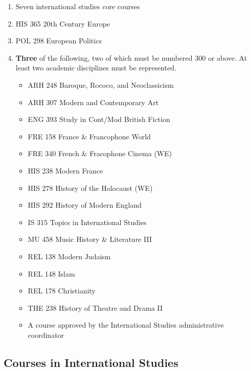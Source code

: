 \documentclass[
  letterpaper,
]{scrbook}
\providecommand{\tightlist}{%
  \setlength{\itemsep}{0pt}\setlength{\parskip}{0pt}}
\begin{document}
\begin{enumerate}
\def\labelenumi{\arabic{enumi}.}
\tightlist
\item
  Seven international studies core courses
\item
  HIS 365 20th Century Europe
\item
  POL 298 European Politics
\item
  \textbf{Three} of the following, two of which must be numbered 300 or
  above. At least two academic disciplines must be represented.

  \begin{itemize}
  \tightlist
  \item
    ARH 248 Baroque, Rococo, and Neoclassicism
  \item
    ARH 307 Modern and Contemporary Art
  \item
    ENG 393 Study in Cont/Mod British Fiction
  \item
    FRE 158 France \& Francophone World
  \item
    FRE 340 French \& Fracophone Cinema (WE)
  \item
    HIS 238 Modern France
  \item
    HIS 278 History of the Holocaust (WE)
  \item
    HIS 292 History of Modern England
  \item
    IS 315 Topics in International Studies
  \item
    MU 458 Music History \& Literature III
  \item
    REL 138 Modern Judaism
  \item
    REL 148 Islam
  \item
    REL 178 Christianity
  \item
    THE 238 History of Theatre and Drama II
  \item
    A course approved by the International Studies administrative
    coordinator
  \end{itemize}
\end{enumerate}

\subsection{Courses in International
Studies}\label{courses-in-international-studies}
\end{document}
